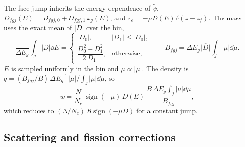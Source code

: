 \documentclass[11pt]{article}
\newcommand{\tpsi}{\tilde\psi}
\begin{document}
The face jump inherits the energy dependence of $\tpsi$,
$D_{fgj}(E) = D_{fgj,0} + D_{fgj,1}\,x_g(E)$, and $r_e = -\mu D(E)\,\delta(z-z_f)$.
The mass uses the exact mean of $|D|$ over the bin,
\begin{equation}
  \frac1{\Delta E_g}\int_g|D|\dd E =
  \begin{cases} |D_0|, & |D_1|\le|D_0|,\\[2pt]
  \dfrac{D_0^2+D_1^2}{2|D_1|}, & \text{otherwise},\end{cases}
  \qquad B_{fgj} = \Delta E_g\,\overline{|D|}\int_j|\mu|\dd\mu .
\end{equation}
$E$ is sampled uniformly in the bin and $\mu\propto|\mu|$. The density is
$q = (B_{fgj}/B)\,\Delta E_g^{-1}\,|\mu|/\!\int_j|\mu|\dd\mu$, so
\begin{equation}
  w = \frac{N}{N_c}\,\operatorname{sign}(-\mu)\,D(E)\,
  \frac{B\,\Delta E_g\int_j|\mu|\dd\mu}{B_{fgj}} ,
\end{equation}
which reduces to $(N/N_c)\,B\operatorname{sign}(-\mu D)$ for a constant jump.

\subsection{Scattering and fission corrections}
\end{document}
